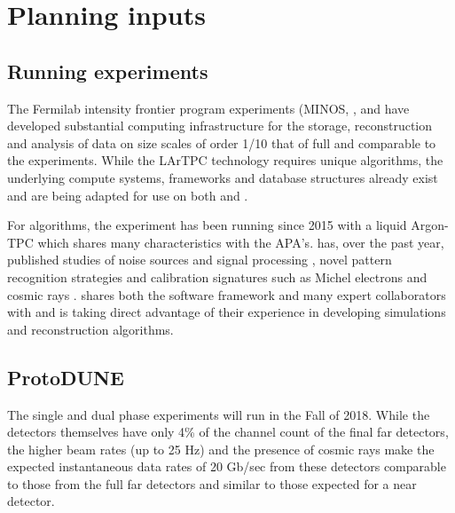  
\section{Planning inputs}


\subsection{Running experiments}\label{sw:IF-input}

The Fermilab intensity frontier program experiments (MINOS\cite{minos},  \cite{minerva}, \cite{microboone} and  \cite{nova} have developed substantial computing infrastructure for the storage, reconstruction and analysis of data on size scales of order 1/10 that of full   and comparable to the  experiments. While the LArTPC technology requires unique algorithms, the underlying compute systems, frameworks and database structures already exist and are being adapted for use on both  and  .

For algorithms, the  \cite{Acciarri:2016smi} experiment has been running since 2015 with a liquid Argon-TPC which shares many characteristics with the   APA's.     has, over the past year, published studies of noise sources and signal processing \cite{Acciarri:2017sde,Adams:2018dra}, novel pattern recognition strategies \cite{Acciarri:2016ryt,Acciarri:2017hat} and calibration signatures such as Michel electrons and cosmic rays \cite{Acciarri:2017sjy,Acciarri:2017sde}.    shares both the \larsoft software framework and many expert collaborators with   and is taking direct advantage of their experience in developing simulations and reconstruction algorithms.


\subsection{ProtoDUNE}\label{sw:PD-planning}

The  single and dual phase experiments will run in the Fall of 2018.  While the detectors themselves have only 4\% of the channel count  of the final far detectors, the higher beam rates (up to 25 Hz) and the presence of cosmic rays make the expected instantaneous data rates of 20 Gb/sec from these detectors comparable to those from the full far detectors and similar to those expected for a near detector. 

